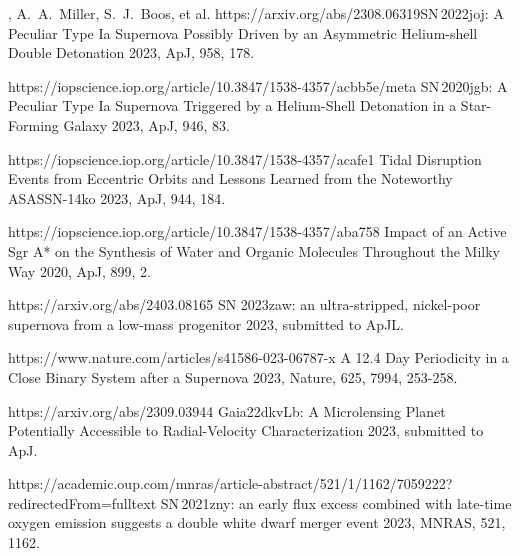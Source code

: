 


\begin{cvpubs}


\cvpub
{ %
\begin{cvitems}
    \item \cvsubpub
    {\Cliu, A.~A.~Miller, S.~J.~Boos, et al.}
    {}
    {https://arxiv.org/abs/2308.06319}{SN\,2022joj: A Peculiar Type Ia Supernova Possibly Driven by an Asymmetric Helium-shell Double Detonation}
    {2023, ApJ, 958, 178.}
    \item {}
    {}
    {https://iopscience.iop.org/article/10.3847/1538-4357/acbb5e/meta}
    {SN\,2020jgb: A Peculiar Type Ia Supernova Triggered by a Helium-Shell Detonation in a Star-Forming Galaxy}
    {2023, ApJ, 946, 83.}
    \item {}
    {}
    {https://iopscience.iop.org/article/10.3847/1538-4357/acafe1}
    {Tidal Disruption Events from Eccentric Orbits and Lessons Learned from the Noteworthy ASASSN-14ko}
    {2023, ApJ, 944, 184.}
    \item {}
    {}
    {https://iopscience.iop.org/article/10.3847/1538-4357/aba758}
    {Impact of an Active Sgr A* on the Synthesis of Water and Organic Molecules Throughout the Milky Way}
    {2020, ApJ, 899, 2.}
    \item {} 
    {\Cliu}
    {https://arxiv.org/abs/2403.08165}
    {SN 2023zaw: an ultra-stripped, nickel-poor supernova from a low-mass progenitor}
    {2023, submitted to ApJL.}
    \item {} 
    {\Cliu}
    {https://www.nature.com/articles/s41586-023-06787-x}
    {A 12.4 Day Periodicity in a Close Binary System after a Supernova}
    {2023, Nature, 625, 7994, 253-258.}
    \item {} 
    {\Cliu}
    {https://arxiv.org/abs/2309.03944}
    {Gaia22dkvLb: A Microlensing Planet Potentially Accessible to Radial-Velocity Characterization}
    {2023, submitted to ApJ.}
    \item {} 
    {\Cliu}
    {https://academic.oup.com/mnras/article-abstract/521/1/1162/7059222?redirectedFrom=fulltext}
    {SN\,2021zny: an early flux excess combined with late-time oxygen emission suggests a double white dwarf merger event}
    {2023, MNRAS, 521, 1162.}
\end{cvitems}
}


\end{cvpubs}
